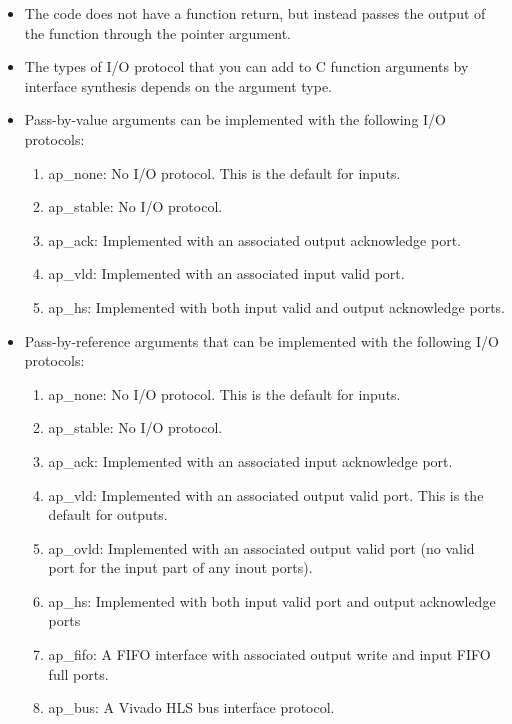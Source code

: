 \begin{itemize}
    \item The code does not have a function return, but instead passes the output of the function through the pointer argument. 
    \item The types of I/O protocol that you can add to C function arguments by interface synthesis
    depends on the argument type.

    \item Pass-by-value arguments can be implemented with the following I/O protocols:
    \begin{enumerate}
        \item ap\_none: No I/O protocol. This is the default for inputs.
        \item ap\_stable: No I/O protocol.
        \item ap\_ack: Implemented with an associated output acknowledge port.
        \item ap\_vld: Implemented with an associated input valid port.
        \item ap\_hs: Implemented with both input valid and output acknowledge ports.
    \end{enumerate}

    \item Pass-by-reference arguments that can be implemented with the following I/O protocols:
    \begin{enumerate}
        \item ap\_none: No I/O protocol. This is the default for inputs.
        \item ap\_stable: No I/O protocol.
        \item ap\_ack: Implemented with an associated input acknowledge port.
        \item ap\_vld: Implemented with an associated output valid port. This is the default for outputs.
        \item ap\_ovld: Implemented with an associated output valid port (no valid port for the input part of any inout ports).
        \item ap\_hs: Implemented with both input valid port and output acknowledge ports
        \item ap\_fifo: A FIFO interface with associated output write and input FIFO full ports.
        \item ap\_bus: A Vivado HLS bus interface protocol.
    \end{enumerate}
\end{itemize}

